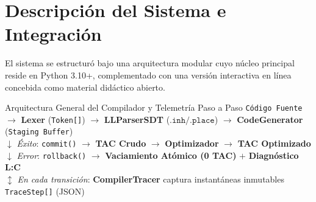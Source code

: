 \documentclass[11pt, letterpaper]{article}
\begin{document}
\section{Descripción del Sistema e Integración}

El sistema se estructuró bajo una arquitectura modular cuyo núcleo principal reside en Python 3.10+, complementado con una versión interactiva en línea concebida como material didáctico abierto.

\begin{archbox}{Arquitectura General del Compilador y Telemetría Paso a Paso}
\centering
\footnotesize
\texttt{Código Fuente} $\longrightarrow$ \textbf{Lexer} (\texttt{Token[]}) $\longrightarrow$ \textbf{LLParserSDT} ($\texttt{.inh} / \texttt{.place}$) $\longrightarrow$ \textbf{CodeGenerator} (\texttt{Staging Buffer})\\
$\downarrow$ \textit{Éxito}: \texttt{commit()} $\longrightarrow$ \textbf{TAC Crudo} $\longrightarrow$ \textbf{Optimizador} $\longrightarrow$ \textbf{TAC Optimizado}\\
$\downarrow$ \textit{Error}: \texttt{rollback()} $\longrightarrow$ \textbf{Vaciamiento Atómico (0 TAC)} $+$ \textbf{Diagnóstico L:C}\\
$\updownarrow$ \textit{En cada transición}: \textbf{CompilerTracer} captura instantáneas inmutables \texttt{TraceStep[]} (JSON)
\end{archbox}
\end{document}

